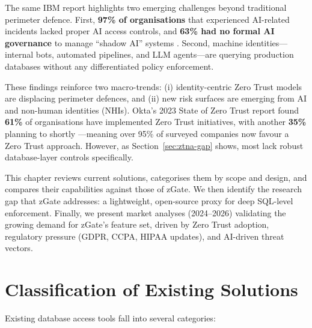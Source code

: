 The same IBM report highlights two emerging challenges beyond traditional perimeter defence. First, \textbf{97\% of organisations} that experienced AI-related incidents lacked proper AI access controls, and \textbf{63\% had no formal AI governance} to manage ``shadow AI'' systems \cite{ibm2025}. Second, machine identities---internal bots, automated pipelines, and LLM agents---are querying production databases without any differentiated policy enforcement.

These findings reinforce two macro-trends: (i) identity-centric Zero Trust models are displacing perimeter defences, and (ii) new risk surfaces are emerging from AI and non-human identities (NHIs). Okta's 2023 State of Zero Trust report found \textbf{61\%} of organisations have implemented Zero Trust initiatives, with another \textbf{35\%} planning to shortly \cite{okta2023zt}---meaning over 95\% of surveyed companies now favour a Zero Trust approach. However, as Section~\ref{sec:ztna-gap} shows, most lack robust database-layer controls specifically.

This chapter reviews current solutions, categorises them by scope and design, and compares their capabilities against those of zGate. We then identify the research gap that zGate addresses: a lightweight, open-source proxy for deep SQL-level enforcement. Finally, we present market analyses (2024--2026) validating the growing demand for zGate's feature set, driven by Zero Trust adoption, regulatory pressure (GDPR, CCPA, HIPAA updates), and AI-driven threat vectors.

\section{Classification of Existing Solutions}

Existing database access tools fall into several categories:

